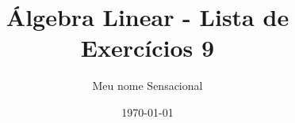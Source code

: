 \documentclass[leqno]{article}
\numberwithin{equation}{section}
\begin{document}
\newtheorem{teo}{Teorema}[section] \newtheorem*{teo*}{Teorema}
\newtheorem{prop}[teo]{Proposição} \newtheorem*{prop*}{Proposição}
\newtheorem{lema}[teo]{Lemma} \newtheorem*{lema*}{Lema}
\newtheorem{cor}[teo]{Corolário} \newtheorem*{cor*}{Corolário}

\theoremstyle{definition}
\newtheorem{defi}[teo]{Definição} \newtheorem*{defi*}{Definição}
\newtheorem{exem}[teo]{Exemplo} \newtheorem*{exem*}{Exemplo}
\newtheorem{obs}[teo]{Observação} \newtheorem*{obs*}{Observação}
\newtheorem*{hipo}{Hipóteses}
\newtheorem*{nota}{Notação}

\newcommand{\ds}{\displaystyle} \newcommand{\nl}{\newline}
\newcommand{\eps}{\varepsilon} \newcommand{\ssty}{\scriptstyle}
\newcommand{\bE}{\mathbb{E}}
\newcommand{\cB}{\mathcal{B}}
\newcommand{\cF}{\mathcal{F}}
\newcommand{\cA}{\mathcal{A}}
\newcommand{\cM}{\mathcal{M}}
\newcommand{\cD}{\mathcal{D}}
\newcommand{\cN}{\mathcal{N}}
\newcommand{\cL}{\mathcal{L}}
\newcommand{\cLN}{\mathcal{LN}}
\newcommand{\bP}{\mathbb{P}}
\newcommand{\bQ}{\mathbb{Q}}
\newcommand{\bN}{\mathbb{N}}
\newcommand{\bR}{\mathbb{R}}
\newcommand{\bZ}{\mathbb{Z}}
\newcommand{\R}{\mathbb{R}}
\newcommand{\defeq}{\vcentcolon =}

\newcommand{\bfw}{\mathbf{w}}
\newcommand{\bfv}{\mathbf{v}}
\newcommand{\bfu}{\mathbf{u}}
\newcommand{\bfx}{\mathbf{x}}
\newcommand{\bfb}{\mathbf{b}}

\newcommand{\bvecc}[2]{%
  \begin{bmatrix} #1 \\ #2  \end{bmatrix}
}
\newcommand{\bveccc}[3]{%
  \begin{bmatrix} #1 \\ #2 \\ #3  \end{bmatrix}
}


\title{Álgebra Linear - Lista de Exercícios 9}

\author{Meu nome Sensacional}

\date{\today}

\maketitle
\end{document}
